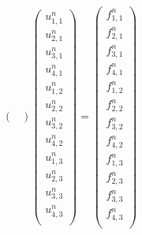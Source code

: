 \documentclass[11pt]{article}
\begin{document}
\begin{equation}
\begin{pmatrix}
\end{pmatrix}
\left(
\begin{array}{c}
u^{n}_{1,1}\\
u^{n}_{2,1}\\
u^{n}_{3,1}\\
u^{n}_{4,1}\\
u^{n}_{1,2}\\
u^{n}_{2,2}\\
u^{n}_{3,2}\\
u^{n}_{4,2}\\
u^{n}_{1,3}\\
u^{n}_{2,3}\\
u^{n}_{3,3}\\
u^{n}_{4,3}\\
\end{array}
\right)
=
\left(
\begin{array}{c}
f^{n}_{1,1}\\
f^{n}_{2,1}\\
f^{n}_{3,1}\\
f^{n}_{4,1}\\
f^{n}_{1,2}\\
f^{n}_{2,2}\\
f^{n}_{3,2}\\
f^{n}_{4,2}\\
f^{n}_{1,3}\\
f^{n}_{2,3}\\
f^{n}_{3,3}\\
f^{n}_{4,3}\\
\end{array}
\right)
\end{equation}
\end{document}
